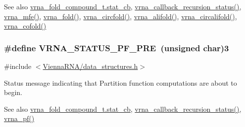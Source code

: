\begin{DoxySeeAlso}{See also}
\hyperlink{group__fold__compound_a87a83f6795b569000efcbe65acc3dd81}{vrna\+\_\+fold\+\_\+compound\+\_\+t.\+stat\+\_\+cb}, \hyperlink{group__fold__compound_ga4a4a0d838de6d18315bafc84f93f5cc0}{vrna\+\_\+callback\+\_\+recursion\+\_\+status()}, \hyperlink{group__mfe__fold_gabd3b147371ccf25c577f88bbbaf159fd}{vrna\+\_\+mfe()}, \hyperlink{group__mfe__fold__single_gae7ca49ffb3086f145da36c964a7cec64}{vrna\+\_\+fold()}, \hyperlink{group__mfe__fold__single_gaa0f5bf321038f404b36a6147bdae4154}{vrna\+\_\+circfold()}, \hyperlink{group__consensus__mfe__fold_ga02098d0c8790f9a37fbef6ad0cfc705c}{vrna\+\_\+alifold()}, \hyperlink{group__consensus__mfe__fold_ga01ce2cff93ea44c4f4254760ca2bd16c}{vrna\+\_\+circalifold()}, \hyperlink{group__mfe__cofold_ga45515db181f17653ef7ef5487ef36d08}{vrna\+\_\+cofold()} 
\end{DoxySeeAlso}
\hypertarget{group__fold__compound_ga91795d35ebdb6f32be50459f24b3d114}{}
\subsubsection[{V\+R\+N\+A\+\_\+\+S\+T\+A\+T\+U\+S\+\_\+\+P\+F\+\_\+\+P\+R\+E}]{\setlength{\rightskip}{0pt plus 5cm}\#define V\+R\+N\+A\+\_\+\+S\+T\+A\+T\+U\+S\+\_\+\+P\+F\+\_\+\+P\+R\+E~(unsigned char)3}\label{group__fold__compound_ga91795d35ebdb6f32be50459f24b3d114}


{\ttfamily \#include $<$\hyperlink{data__structures_8h}{Vienna\+R\+N\+A/data\+\_\+structures.\+h}$>$}



Status message indicating that Partition function computations are about to begin. 

\begin{DoxySeeAlso}{See also}
\hyperlink{group__fold__compound_a87a83f6795b569000efcbe65acc3dd81}{vrna\+\_\+fold\+\_\+compound\+\_\+t.\+stat\+\_\+cb}, \hyperlink{group__fold__compound_ga4a4a0d838de6d18315bafc84f93f5cc0}{vrna\+\_\+callback\+\_\+recursion\+\_\+status()}, \hyperlink{group__pf__fold_ga29e256d688ad221b78d37f427e0e99bc}{vrna\+\_\+pf()} 
\end{DoxySeeAlso}
\hypertarget{group__fold__compound_ga1c6fa243533fd026e50f7d595eaaa565}{}
